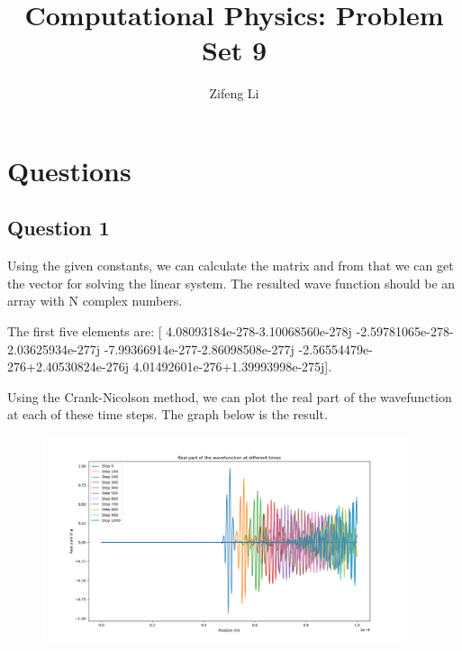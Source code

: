 \documentclass[11pt]{article}
\title{Computational Physics: Problem Set 9}
\author{Zifeng Li}
\begin{document}
\maketitle

\section{Questions}

\subsection{Question 1}

Using the given constants, we can calculate the matrix and from that we can get
the vector for solving the linear system. The resulted wave function should be
an array with N complex numbers.

The first five elements are: [ 4.08093184e-278-3.10068560e-278j -2.59781065e-278-2.03625934e-277j
 -7.99366914e-277-2.86098508e-277j -2.56554479e-276+2.40530824e-276j
  4.01492601e-276+1.39993998e-275j].

Using the Crank-Nicolson method, we can plot the real part of the wavefunction at
each of these time steps. The graph below is the result.
\begin{figure}[b!]
\centering
\includegraphics[width=0.95\textwidth]{Real part of the wavefunction at different times.png}
\end{figure}
\end{document}
